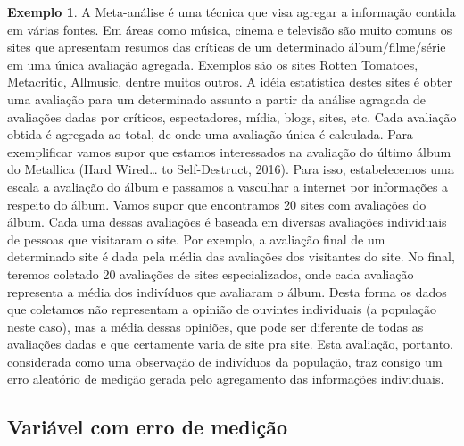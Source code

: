 \documentclass[
]{book}
\theoremstyle{definition}
\theoremstyle{definition}
\newtheorem{example}{Exemplo}[chapter]
\theoremstyle{definition}
\theoremstyle{remark}
\begin{document}
\begin{example}
\protect\hypertarget{exm:metaanalise}{}{\label{exm:metaanalise} }A Meta-análise é uma técnica que visa agregar a informação contida em várias fontes. Em áreas como música, cinema e televisão são muito comuns os sites que apresentam resumos das críticas de um determinado álbum/filme/série em uma única avaliação agregada. Exemplos são os sites Rotten Tomatoes, Metacritic, Allmusic, dentre muitos outros. A idéia estatística destes sites é obter uma avaliação para um determinado assunto a partir da análise agragada de avaliações dadas por críticos, espectadores, mídia, blogs, sites, etc. Cada avaliação obtida é agregada ao total, de onde uma avaliação única é calculada. Para exemplificar vamos supor que estamos interessados na avaliação do último álbum do Metallica (Hard Wired\ldots{} to Self-Destruct, 2016). Para isso, estabelecemos uma escala a avaliação do álbum e passamos a vasculhar a internet por informações a respeito do álbum. Vamos supor que encontramos 20 sites com avaliações do álbum. Cada uma dessas avaliações é baseada em diversas avaliações individuais de pessoas que visitaram o site. Por exemplo, a avaliação final de um determinado site é dada pela média das avaliações dos visitantes do site. No final, teremos coletado 20 avaliações de sites especializados, onde cada avaliação representa a média dos indivíduos que avaliaram o álbum. Desta forma os dados que coletamos não representam a opinião de ouvintes individuais (a população neste caso), mas a média dessas opiniões, que pode ser diferente de todas as avaliações dadas e que certamente varia de site pra site. Esta avaliação, portanto, considerada como uma observação de indivíduos da população, traz consigo um erro aleatório de medição gerada pelo agregamento das informações individuais.
\end{example}

\hypertarget{variuxe1vel-com-erro-de-mediuxe7uxe3o}{%
\subsection{Variável com erro de medição}\label{variuxe1vel-com-erro-de-mediuxe7uxe3o}}
\end{document}
